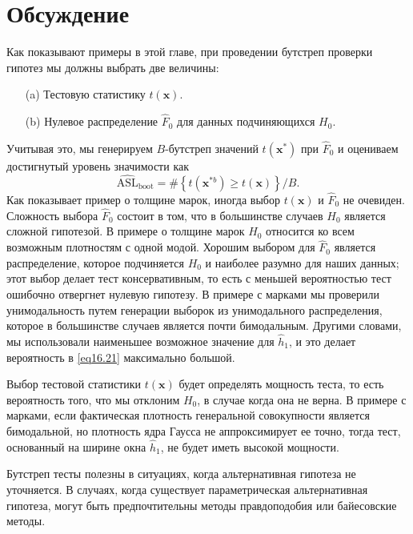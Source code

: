 \section{Обсуждение}

Как показывают примеры в этой главе, при проведении бутстреп проверки гипотез мы должны выбрать две величины:
\begin{enumerate}
    \item[(a)] Тестовую статистику $t(\mathbf{x})$.
    \item[(b)] Нулевое распределение $\hat{F}_0$ для данных подчиняющихся $H_0$.
\end{enumerate}

Учитывая это, мы генерируем $B$-бутстреп значений $t(\mathbf{x}^{*})$ при $\hat{F}_0$ и оцениваем достигнутый уровень значимости как
\begin{equation}\label{eq16.24}
    \widehat{\text{ASL}}_{\text{boot}} = \#\left\{t(\mathbf{x}^{*b}) \geq t(\mathbf{x})\right\}/B.
\end{equation}
Как показывает пример о толщине марок, иногда выбор $t(\mathbf{x})$ и $\hat{F}_0$ не очевиден. Сложность выбора $\hat{F}_0$ состоит в том, что в большинстве случаев $H_0$ является сложной гипотезой. В примере о толщине марок $H_0$ относится ко всем возможным плотностям с одной модой. Хорошим выбором для $\hat{F}_0$ является распределение, которое подчиняется $H_0$ и наиболее разумно для наших данных; этот выбор делает тест консервативным, то есть с меньшей вероятностью тест ошибочно отвергнет нулевую гипотезу. В примере с марками мы проверили унимодальность путем генерации выборок из унимодального распределения, которое в большинстве случаев является почти бимодальным. Другими словами, мы использовали наименьшее возможное значение для $\hat{h}_1$, и это делает вероятность в \ref{eq16.21} максимально большой.

Выбор тестовой статистики $t(\mathbf{x})$ будет определять мощность теста, то есть вероятность того, что мы отклоним $H_0$, в случае когда она не верна. В примере с марками, если фактическая плотность генеральной совокупности является бимодальной, но плотность ядра Гаусса не аппроксимирует ее точно, тогда тест, основанный на ширине окна $\hat{h}_1$, не будет иметь высокой мощности.

Бутстреп тесты полезны в ситуациях, когда альтернативная гипотеза не уточняется. В случаях, когда существует параметрическая альтернативная гипотеза, могут быть предпочтительны методы правдоподобия или байесовские методы.